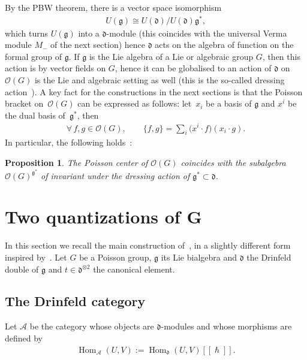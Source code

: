 \documentclass[10pt,a4paper]{amsart}
\numberwithin{equation}{section}
\newcommand{\mf}[1]{\mathfrak{#1}}
\newcommand{\h}{\hslash}
\newcommand{\ot}{\otimes}
\newcommand{\cO}{\mathcal O}
\newcommand{\cA}{\mathcal {A}}
\renewcommand{\hom}{\operatorname{Hom}}
\newtheorem{prop}[thm]{Proposition}
\theoremstyle{definition}
\begin{document}
By the PBW theorem, there is a vector space isomorphism
\begin{gather*}
	U(\mf g)\cong U(\mf d)/U(\mf d)\mf g^*,
\end{gather*}
which turns $U(\mf g)$ into a $\mf d$-module (this coincides with the universal Verma module $M_-$ of the next section) hence $\mf d$ acts on the algebra of function on the formal group of $\mf g$. If $\mf g$ is the Lie algebra of a Lie or algebraic group $G$, then this action is by vector f\/ields on $G$, hence it can be globalised to an action of $\mf d$ on $\cO(G)$ is the Lie and algebraic setting as well (this is the so-called dressing action~\cite{Semenov-Tian-Shansky1985}). A key fact for the constructions in the next sections is that the Poisson bracket on~$\cO(G)$ can be expressed as follows: let~$x_i$ be a basis of $\mf g$ and $x^i$ be the dual basis of~$\mf g^*$, then
\begin{gather*}
	\forall\, f,g \in \cO(G),\qquad \{f,g\}=\sum_i \big(x^i\cdot f\big)(x_i\cdot g).
\end{gather*}
In particular, the following holds~\cite{Semenov-Tian-Shansky1985}:
\begin{prop}\label{prop:dressing}
The Poisson center of $\cO(G)$ coincides with the subalgebra $\cO(G)^{\mf g^*}$ of invariant under the dressing action of $\mf g^* \subset \mf d$.
\end{prop}

\section[Two quantizations of $G$]{Two quantizations of $\boldsymbol{G}$}
In this section we recall the main construction of~\cite{Etingof1996}, in a slightly dif\/ferent form inspired by~\cite{Severa2016}. Let $G$ be a Poisson group, $\mf g$ its Lie bialgebra and $\mf d$ the Drinfeld double of $\mf g$ and $t \in \mf d^{\ot 2}$ the canonical element.

\subsection{The Drinfeld category}

Let $\cA$ be the category whose objects are $\mf d$-modules and whose morphisms are def\/ined by
\begin{gather*}
	\hom_\cA(U,V):=\hom_{\mf d}(U,V)[[\h]].
\end{gather*}
\end{document}
